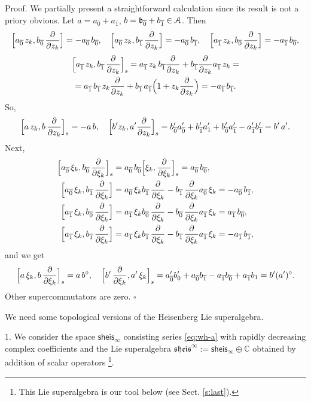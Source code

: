 \documentclass[]{amsart}
\def\cA{\EuScript A}
\def\C {{\mathbb C }}
\def\ov{\overline}
\def\b{\mathfrak b}
\def\sm{\smallskip}
\def\0{{\ov 0}}
\def\1{{\ov 1}}
\def\sheis{\mathsf{sheis}}
\def\frheis{\mathfrak{sheis}}
\begin{document}
{\sc Proof.} We partially present a straightforward calculation since its result is not a priory
obvious. Let $a=a_\0+a_\1$, $b=\b_\0+b_\1\in \cA$. Then
\begin{equation*}
\Bigl[a_\0\, z_k,b_\0\, \frac\partial{\partial z_k}\Bigr]=-a_\0\, b_\0,\quad
\Bigl[a_\0\, z_k,b_\1\, \frac\partial{\partial z_k}\Bigr]=-a_\0\, b_\1,
\quad
\Bigl[a_\1\, z_k,b_\0\, \frac\partial{\partial z_k}\Bigr]=-a_\1\, b_\0,
\end{equation*}
\begin{multline*}
\Bigl[a_\1\, z_k,b_\1\, \frac\partial{\partial z_k}\Bigr]_s
=a_\1\, z_k\, b_\1  \frac\partial{\partial z_k}+ 
b_\1 \frac\partial{\partial z_k} a_\1\, z_k
=\\=
a_\1\, b_\1\, z_k   \frac\partial{\partial z_k}+b_\1\, a_\1 
\Bigl(1+z_k   \frac\partial{\partial z_k}\Bigr)=
-a_\1\, b_\1. 	
\end{multline*}	
So,
$$
\Bigl[a\, z_k,b\, \frac\partial{\partial z_k}\Bigr]_s=-a\, b,
\quad 
\Bigl[b'z_k, a' \frac\partial{\partial z_k}\Bigr]_s=b'_\0 a'_\0+ b'_\1 a'_1+b'_\0 a'_\1- a'_\1b'_\1=b'\, a'.
$$
Next,
\begin{align*}
	\Bigl[a_\0\, \xi_k , b_\0\, \frac\partial{\partial \xi_k}\Bigr]_s&=
a_\0\, b_\0 \Bigl[\xi_k, \frac\partial{\partial \xi_k} \Bigr]_s=
a_\0\, b_\0,
\\
\Bigl[a_\0\, \xi_k , b_\1\, \frac\partial{\partial \xi_k}\Bigr]&=
a_\0\, \xi_k  b_\1\, \frac\partial{\partial \xi_k}-
 b_\1\, \frac\partial{\partial \xi_k} a_\0\, \xi_k=-a_\0\,b_\1 ,
 \\
\Bigl[a_\1\, \xi_k , b_\0\, \frac\partial{\partial \xi_k}\Bigr]&=
a_\1\, \xi_k  b_\0\, \frac\partial{\partial \xi_k}-
b_\0\, \frac\partial{\partial \xi_k} a_\1\, \xi_k=a_\1\,b_\0, \\
\Bigl[a_\1\, \xi_k , b_\1\, \frac\partial{\partial \xi_k}\Bigr]&=
a_\1\, \xi_k  b_\1\, \frac\partial{\partial \xi_k}-
b_\1\, \frac\partial{\partial \xi_k} a_\1\, \xi_k=-a_\1\,b_\1, 
\end{align*}
and we get 
$$
\Bigl[a\, \xi_k , b\, \frac\partial{\partial \xi_k}\Bigr]_s=a\,b^\circ,\quad
\Bigl[b'\, \frac\partial{\partial \xi_k},a'\, \xi_k \Bigr]_s=a_\0' b_0'+a_\0 b_\1 -a_\1 b_\0+a_\1 b_1
=b' (a')^\circ.
$$
Other supercommutators are zero.
\hfill $\square$
 
 \sm  

We need some topological versions of the Heisenberg Lie superalgebra.

\sm

1. We consider the space $\sheis_\infty$
consisting  series \eqref{eq:wh-a}
with rapidly decreasing complex  coefficients  and 
the Lie superalgebra 
$\frheis^\infty:= \sheis_\infty\oplus \C$ obtained by addition
of scalar operators%
\footnote{This Lie superalgebra is our tool below (see Sect. \ref{s:last}).}.
\end{document}
